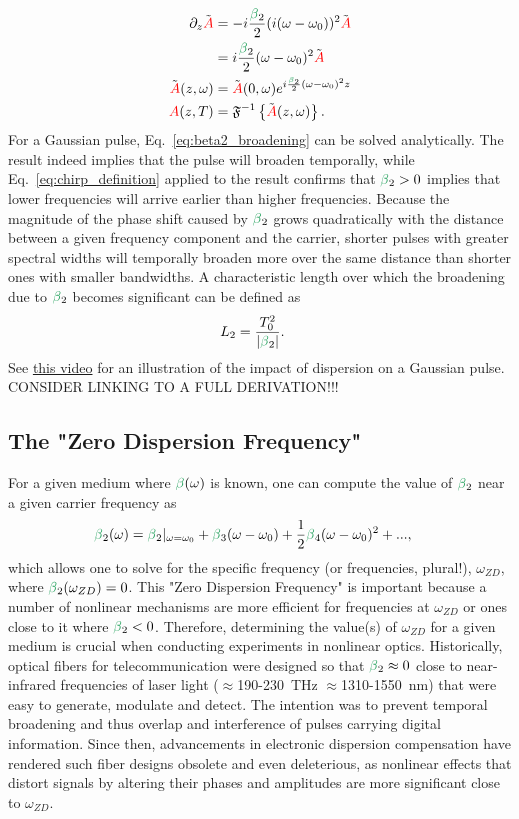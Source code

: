 \begin{align}
    \label{eq:beta2_broadening}
    \partial_z \Tilde{\A} &= -i  \frac{\betag_2}{2} (i(\omega-\omega_0))^2 \Tilde{\A} \\ \nonumber
    &= i  \frac{\betag_2}{2}(\omega-\omega_0)^2\Tilde{\A} \\ \nonumber
    \Tilde{\A}(z,\omega)&=\Tilde{\A}(0,\omega)e^{i\frac{\betag_2}{2}(\omega-\omega_0)^2z} \\ \nonumber
    \A(z,T) &= \IFT\left\{  \Tilde{\A}(z,\omega)   \right\}.
\end{align}
For a Gaussian pulse, Eq.~\ref{eq:beta2_broadening} can be solved analytically. The result indeed implies that the pulse will broaden temporally, while Eq.~\ref{eq:chirp_definition} applied to the result confirms that $\betag_2>0$ implies that lower frequencies will arrive earlier than higher frequencies. Because the magnitude of the phase shift caused by $\betag_2$ grows quadratically with the distance between a given frequency component and the carrier, shorter pulses with greater spectral widths will temporally broaden more over the same distance than shorter ones with smaller bandwidths. A characteristic length over which the broadening due to $\betag_2$ becomes significant can be defined as
\begin{align}
    \label{eq:Dispersion_length}
    L_{2} &= \frac{T_0^2}{|\betag_2|}.
\end{align}
See \href{https://www.youtube.com/watch?v=BP6Ra98AEuU}{this video} for an illustration of the impact of dispersion on a Gaussian pulse.   CONSIDER LINKING TO A FULL DERIVATION!!!

\subsection{The "Zero Dispersion Frequency"}
\label{subsec:ZDF}
For a given medium where $\betag(\omega)$ is known, one can compute the value of $\betag_2$ near a given carrier frequency as
\begin{align}
\label{eq:ZDF}
    \betag_2(\omega) &= \betag_2|_{\omega=\omega_0} + \betag_3(\omega-\omega_0)+\frac{1}{2}\betag_4(\omega-\omega_0)^2 +...,
\end{align}
which allows one to solve for the specific frequency (or frequencies, plural!), $\omega_{ZD}$, where $\betag_2(\omega_{ZD})=0$. This "Zero Dispersion Frequency" is important because a number of nonlinear mechanisms are more efficient for frequencies at $\omega_{ZD}$ or ones close to it where $\betag_2<0$. Therefore, determining the value(s) of $\omega_{ZD}$ for a given medium is crucial when conducting experiments in nonlinear optics. Historically, optical fibers for telecommunication were designed so that $\betag_2\approx0$ close to near-infrared frequencies of laser light ($\approx$190-230~THz $\approx$1310-1550~nm) that were easy to generate, modulate and detect. The intention was to prevent temporal broadening and thus overlap and interference of pulses carrying digital information. Since then, advancements in electronic dispersion compensation have rendered such fiber designs obsolete and even deleterious, as nonlinear effects that distort signals by altering their phases and amplitudes are more significant close to $\omega_{ZD}$.


